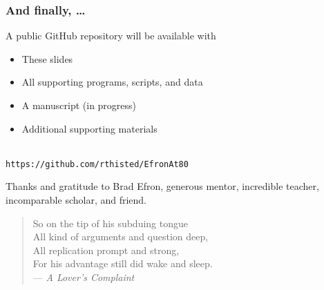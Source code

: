 \begin{frame}
	\frametitle{And finally, \dots}
	
A public GitHub repository will be available with
		\begin{itemize}
			\item These slides
			\item All supporting programs, scripts, and data
			\item A manuscript (in progress)
			\item Additional supporting materials
		\end{itemize}
		\strut\\
		\texttt{https://github.com/rthisted/EfronAt80}
	\bigskip
	
	Thanks and gratitude to Brad Efron, generous mentor, incredible teacher, incomparable scholar, and friend.
	
	\bigskip
	\begin{quotation}
		 	So on the tip of his subduing tongue\\
		 	All kind of arguments and question deep,\\
		 	All replication prompt and strong,\\
		 	For his advantage still did wake and sleep.\\
		 {\qquad\qquad--- \textit{A Lover's Complaint}} %
	\end{quotation}
	
\end{frame}
